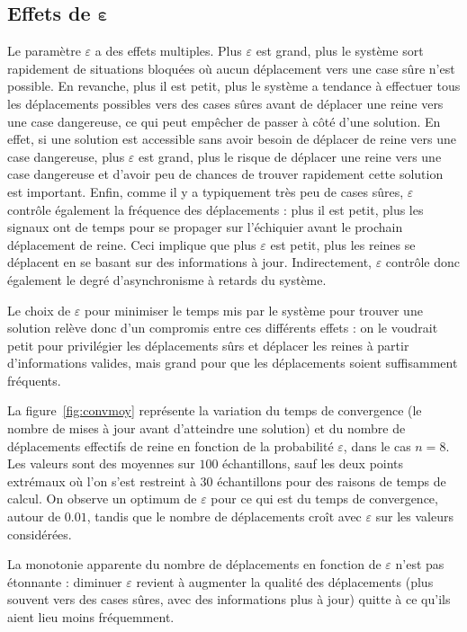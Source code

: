 \documentclass[11pt, openany, a4paper]{article}
\begin{document}
\subsection{Effets de $\boldsymbol \varepsilon$}



Le paramètre $\varepsilon$ a des effets multiples. Plus $\varepsilon$ est grand, plus le système sort rapidement de situations bloquées où aucun déplacement vers une case sûre n'est possible. En revanche, plus il est petit, plus le système a tendance à effectuer tous les déplacements possibles vers des cases sûres avant de déplacer une reine vers une case dangereuse, ce qui peut empêcher de passer à côté d'une solution. En effet, si une solution est accessible sans avoir besoin de déplacer de reine vers une case dangereuse, plus $\varepsilon$ est grand, plus le risque de déplacer une reine vers une case dangereuse et d'avoir peu de chances de trouver rapidement cette solution est important. Enfin, comme il y a typiquement très peu de cases sûres, $\varepsilon$ contrôle également la fréquence des déplacements : plus il est petit, plus les signaux ont de temps pour se propager sur l'échiquier avant le prochain déplacement de reine. Ceci implique que plus $\varepsilon$ est petit, plus les reines se déplacent en se basant sur des informations à jour. Indirectement, $\varepsilon$ contrôle donc également le degré d'asynchronisme à retards du système. 

Le choix de $\varepsilon$ pour minimiser le temps mis par le système pour trouver une solution relève donc d'un compromis entre ces différents effets : on le voudrait petit pour privilégier les déplacements sûrs et déplacer les reines à partir d'informations valides, mais grand pour que les déplacements soient suffisamment fréquents.

La figure~\ref{fig:convmoy} représente la variation du temps de convergence (le nombre de mises à jour avant d'atteindre une solution) et du nombre de déplacements effectifs de reine en fonction de la probabilité $\varepsilon$, dans le cas $n=8$. Les valeurs sont des moyennes sur $100$ échantillons, sauf les deux points extrémaux où l'on s'est restreint à $30$ échantillons pour des raisons de temps de calcul. On observe un optimum de $\varepsilon$ pour ce qui est du temps de convergence, autour de $0.01$, tandis que le nombre de déplacements croît avec $\varepsilon$ sur les valeurs considérées. 

La monotonie apparente du nombre de déplacements en fonction de $\varepsilon$ n'est pas étonnante : diminuer $\varepsilon$ revient à augmenter la qualité des déplace\-ments (plus souvent vers des cases sûres, avec des informations plus à jour) quitte à ce qu'ils aient lieu moins fréquemment.
\end{document}

